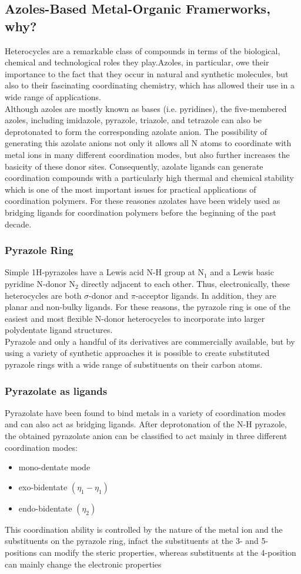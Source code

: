 \documentclass[../Master.tex]{subfiles}
\begin{document}
\subsection{Azoles-Based Metal-Organic Framerworks, why?}
Heterocycles are a remarkable class of compounds in terms of the biological, chemical and technological roles they play.Azoles, in particular, owe their importance to the fact that they occur in natural and synthetic molecules, but also to their fascinating coordinating chemistry, which has allowed their use in a wide range of applications. \\
Although azoles are mostly known as bases (i.e. pyridines), the five-membered azoles, including imidazole, pyrazole, triazole, and tetrazole can also be deprotonated to form the corresponding azolate anion. The possibility of generating this azolate anions not only it allows all N atoms to coordinate with metal ions in many different coordination modes, but also further increases the basicity of these donor sites. Consequently, azolate ligands can generate coordination compounds with a particularly high thermal and chemical stability  which is one of the most important issues for practical applications of coordination polymers.
For these reasones azolates have been widely used as bridging ligands for coordination polymers before the beginning of the past decade.
\subsubsection{Pyrazole Ring}
Simple 1H-pyrazoles have a Lewis acid N-H group at N$_1$ and a Lewis basic pyridine N-donor N$_2$ directly adjacent to each other. Thus, electronically, these heterocycles are both $\sigma$-donor and $\pi$-acceptor ligands. In addition, they are planar and non-bulky ligands. For these reasons, the pyrazole ring is one of the easiest and most flexible N-donor heterocycles to incorporate into larger polydentate ligand structures. \\
Pyrazole and only a handful of its derivatives are commercially available, but by using a variety of synthetic approaches it is possible to create substituted pyrazole rings with a wide range of substituents on their carbon atoms.
\subsubsection{Pyrazolate as ligands}
Pyrazolate have been found to bind metals in a variety of coordination modes and can also act as bridging ligands.
After deprotonation of the N-H pyrazole, the obtained pyrazolate anion can be classified to act mainly in three different coordination modes:
\begin{itemize}
	\item  mono-dentate mode
	\item exo-bidentate \((\eta_{1}-\eta_{1})\)
	\item endo-bidentate \((\eta_{2})\)
\end{itemize}
This coordination ability is controlled by the nature of the metal ion and the substituents on the pyrazole ring, infact the substituents at the 3- and 5- positions can modify the steric properties, whereas substituents at the 4-position can mainly change the electronic properties



\end{document}

